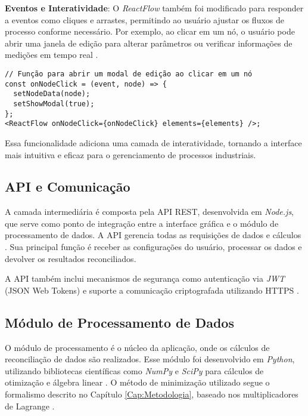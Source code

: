 \textbf{Eventos e Interatividade}: O \textit{ReactFlow} também foi modificado para responder a eventos como cliques e arrastes, permitindo ao usuário ajustar os fluxos de processo conforme necessário. Por exemplo, ao clicar em um nó, o usuário pode abrir uma janela de edição para alterar parâmetros ou verificar informações de medições em tempo real \cite{reactflowinteraction2024}.

\begin{verbatim}
// Função para abrir um modal de edição ao clicar em um nó
const onNodeClick = (event, node) => {
  setNodeData(node);
  setShowModal(true);
};
<ReactFlow onNodeClick={onNodeClick} elements={elements} />;
\end{verbatim}

Essa funcionalidade adiciona uma camada de interatividade, tornando a interface mais intuitiva e eficaz para o gerenciamento de processos industriais.

\subsection{API e Comunicação}
\label{Sec:API}

A camada intermediária é composta pela API REST, desenvolvida em \textit{Node.js}, que serve como ponto de integração entre a interface gráfica e o módulo de processamento de dados. A API gerencia todas as requisições de dados e cálculos \cite{nodejsapi2024}. Sua principal função é receber as configurações do usuário, processar os dados e devolver os resultados reconciliados.

A API também inclui mecanismos de segurança como autenticação via \textit{JWT} (JSON Web Tokens) e suporte a comunicação criptografada utilizando HTTPS \cite{jwtsecurity2024}.

\subsection{Módulo de Processamento de Dados}
\label{Sec:ModuloProcessamento}

O módulo de processamento é o núcleo da aplicação, onde os cálculos de reconciliação de dados são realizados. Esse módulo foi desenvolvido em \textit{Python}, utilizando bibliotecas científicas como \textit{NumPy} e \textit{SciPy} para cálculos de otimização e álgebra linear \cite{numpyscipy2024}. O método de minimização utilizado segue o formalismo descrito no Capítulo \ref{Cap:Metodologia}, baseado nos multiplicadores de Lagrange \cite{lagrangeoptimization2024}.

